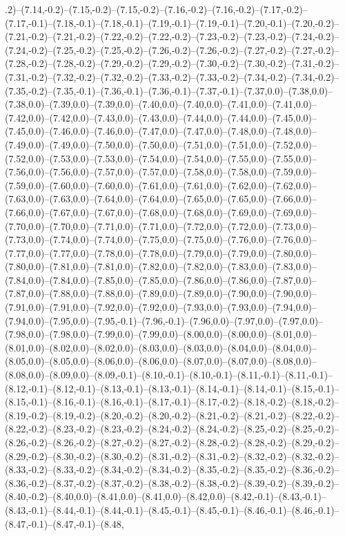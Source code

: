 .2)--(7.14,-0.2)--(7.15,-0.2)--(7.15,-0.2)--(7.16,-0.2)--(7.16,-0.2)--(7.17,-0.2)--(7.17,-0.1)--(7.18,-0.1)--(7.18,-0.1)--(7.19,-0.1)--(7.19,-0.1)--(7.20,-0.1)--(7.20,-0.2)--(7.21,-0.2)--(7.21,-0.2)--(7.22,-0.2)--(7.22,-0.2)--(7.23,-0.2)--(7.23,-0.2)--(7.24,-0.2)--(7.24,-0.2)--(7.25,-0.2)--(7.25,-0.2)--(7.26,-0.2)--(7.26,-0.2)--(7.27,-0.2)--(7.27,-0.2)--(7.28,-0.2)--(7.28,-0.2)--(7.29,-0.2)--(7.29,-0.2)--(7.30,-0.2)--(7.30,-0.2)--(7.31,-0.2)--(7.31,-0.2)--(7.32,-0.2)--(7.32,-0.2)--(7.33,-0.2)--(7.33,-0.2)--(7.34,-0.2)--(7.34,-0.2)--(7.35,-0.2)--(7.35,-0.1)--(7.36,-0.1)--(7.36,-0.1)--(7.37,-0.1)--(7.37,0.0)--(7.38,0.0)--(7.38,0.0)--(7.39,0.0)--(7.39,0.0)--(7.40,0.0)--(7.40,0.0)--(7.41,0.0)--(7.41,0.0)--(7.42,0.0)--(7.42,0.0)--(7.43,0.0)--(7.43,0.0)--(7.44,0.0)--(7.44,0.0)--(7.45,0.0)--(7.45,0.0)--(7.46,0.0)--(7.46,0.0)--(7.47,0.0)--(7.47,0.0)--(7.48,0.0)--(7.48,0.0)--(7.49,0.0)--(7.49,0.0)--(7.50,0.0)--(7.50,0.0)--(7.51,0.0)--(7.51,0.0)--(7.52,0.0)--(7.52,0.0)--(7.53,0.0)--(7.53,0.0)--(7.54,0.0)--(7.54,0.0)--(7.55,0.0)--(7.55,0.0)--(7.56,0.0)--(7.56,0.0)--(7.57,0.0)--(7.57,0.0)--(7.58,0.0)--(7.58,0.0)--(7.59,0.0)--(7.59,0.0)--(7.60,0.0)--(7.60,0.0)--(7.61,0.0)--(7.61,0.0)--(7.62,0.0)--(7.62,0.0)--(7.63,0.0)--(7.63,0.0)--(7.64,0.0)--(7.64,0.0)--(7.65,0.0)--(7.65,0.0)--(7.66,0.0)--(7.66,0.0)--(7.67,0.0)--(7.67,0.0)--(7.68,0.0)--(7.68,0.0)--(7.69,0.0)--(7.69,0.0)--(7.70,0.0)--(7.70,0.0)--(7.71,0.0)--(7.71,0.0)--(7.72,0.0)--(7.72,0.0)--(7.73,0.0)--(7.73,0.0)--(7.74,0.0)--(7.74,0.0)--(7.75,0.0)--(7.75,0.0)--(7.76,0.0)--(7.76,0.0)--(7.77,0.0)--(7.77,0.0)--(7.78,0.0)--(7.78,0.0)--(7.79,0.0)--(7.79,0.0)--(7.80,0.0)--(7.80,0.0)--(7.81,0.0)--(7.81,0.0)--(7.82,0.0)--(7.82,0.0)--(7.83,0.0)--(7.83,0.0)--(7.84,0.0)--(7.84,0.0)--(7.85,0.0)--(7.85,0.0)--(7.86,0.0)--(7.86,0.0)--(7.87,0.0)--(7.87,0.0)--(7.88,0.0)--(7.88,0.0)--(7.89,0.0)--(7.89,0.0)--(7.90,0.0)--(7.90,0.0)--(7.91,0.0)--(7.91,0.0)--(7.92,0.0)--(7.92,0.0)--(7.93,0.0)--(7.93,0.0)--(7.94,0.0)--(7.94,0.0)--(7.95,0.0)--(7.95,-0.1)--(7.96,-0.1)--(7.96,0.0)--(7.97,0.0)--(7.97,0.0)--(7.98,0.0)--(7.98,0.0)--(7.99,0.0)--(7.99,0.0)--(8.00,0.0)--(8.00,0.0)--(8.01,0.0)--(8.01,0.0)--(8.02,0.0)--(8.02,0.0)--(8.03,0.0)--(8.03,0.0)--(8.04,0.0)--(8.04,0.0)--(8.05,0.0)--(8.05,0.0)--(8.06,0.0)--(8.06,0.0)--(8.07,0.0)--(8.07,0.0)--(8.08,0.0)--(8.08,0.0)--(8.09,0.0)--(8.09,-0.1)--(8.10,-0.1)--(8.10,-0.1)--(8.11,-0.1)--(8.11,-0.1)--(8.12,-0.1)--(8.12,-0.1)--(8.13,-0.1)--(8.13,-0.1)--(8.14,-0.1)--(8.14,-0.1)--(8.15,-0.1)--(8.15,-0.1)--(8.16,-0.1)--(8.16,-0.1)--(8.17,-0.1)--(8.17,-0.2)--(8.18,-0.2)--(8.18,-0.2)--(8.19,-0.2)--(8.19,-0.2)--(8.20,-0.2)--(8.20,-0.2)--(8.21,-0.2)--(8.21,-0.2)--(8.22,-0.2)--(8.22,-0.2)--(8.23,-0.2)--(8.23,-0.2)--(8.24,-0.2)--(8.24,-0.2)--(8.25,-0.2)--(8.25,-0.2)--(8.26,-0.2)--(8.26,-0.2)--(8.27,-0.2)--(8.27,-0.2)--(8.28,-0.2)--(8.28,-0.2)--(8.29,-0.2)--(8.29,-0.2)--(8.30,-0.2)--(8.30,-0.2)--(8.31,-0.2)--(8.31,-0.2)--(8.32,-0.2)--(8.32,-0.2)--(8.33,-0.2)--(8.33,-0.2)--(8.34,-0.2)--(8.34,-0.2)--(8.35,-0.2)--(8.35,-0.2)--(8.36,-0.2)--(8.36,-0.2)--(8.37,-0.2)--(8.37,-0.2)--(8.38,-0.2)--(8.38,-0.2)--(8.39,-0.2)--(8.39,-0.2)--(8.40,-0.2)--(8.40,0.0)--(8.41,0.0)--(8.41,0.0)--(8.42,0.0)--(8.42,-0.1)--(8.43,-0.1)--(8.43,-0.1)--(8.44,-0.1)--(8.44,-0.1)--(8.45,-0.1)--(8.45,-0.1)--(8.46,-0.1)--(8.46,-0.1)--(8.47,-0.1)--(8.47,-0.1)--(8.48,